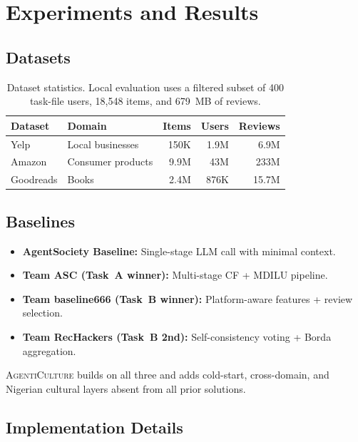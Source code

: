 \documentclass[11pt]{article}
\newcommand{\system}{\textsc{AgentiCulture}\xspace}
\begin{document}
\section{Experiments and Results}

\subsection{Datasets}

\begin{table}[h]
\centering
\small
\begin{tabular}{llrrr}
\toprule
\textbf{Dataset} & \textbf{Domain} & \textbf{Items} & \textbf{Users} & \textbf{Reviews} \\
\midrule
Yelp        & Local businesses   & 150K  & 1.9M  & 6.9M  \\
Amazon      & Consumer products  & 9.9M  & 43M   & 233M  \\
Goodreads   & Books              & 2.4M  & 876K  & 15.7M \\
\bottomrule
\end{tabular}
\caption{Dataset statistics. Local evaluation uses a filtered subset of 400 task-file users, 18,548 items, and 679~MB of reviews.}
\label{tab:datasets}
\end{table}

\subsection{Baselines}
\begin{itemize}
  \item \textbf{AgentSociety Baseline:} Single-stage LLM call with minimal context.
  \item \textbf{Team ASC (Task~A winner):} Multi-stage CF + MDILU pipeline.
  \item \textbf{Team baseline666 (Task~B winner):} Platform-aware features + review selection.
  \item \textbf{Team RecHackers (Task~B 2nd):} Self-consistency voting + Borda aggregation.
\end{itemize}
\system builds on all three and adds cold-start, cross-domain, and Nigerian cultural layers absent from all prior solutions.

\subsection{Implementation Details}
\end{document}
